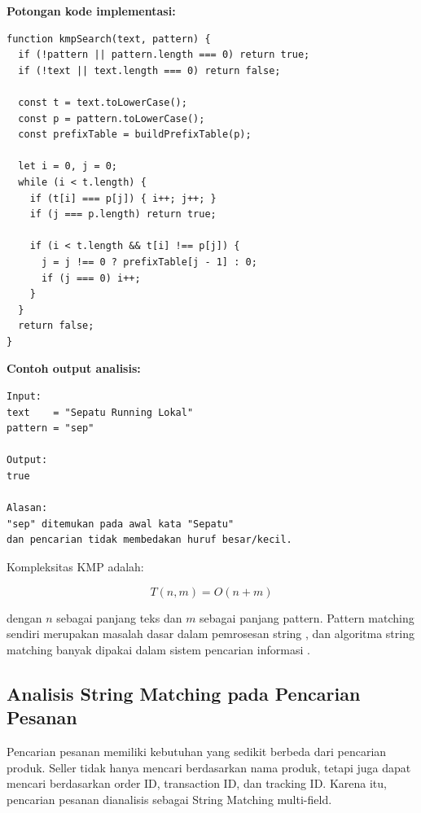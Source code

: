 \newpage
\textbf{Potongan kode implementasi:}

\begin{Verbatim}[frame=single,framesep=6pt,fontsize=\scriptsize]
function kmpSearch(text, pattern) {
  if (!pattern || pattern.length === 0) return true;
  if (!text || text.length === 0) return false;

  const t = text.toLowerCase();
  const p = pattern.toLowerCase();
  const prefixTable = buildPrefixTable(p);

  let i = 0, j = 0;
  while (i < t.length) {
    if (t[i] === p[j]) { i++; j++; }
    if (j === p.length) return true;

    if (i < t.length && t[i] !== p[j]) {
      j = j !== 0 ? prefixTable[j - 1] : 0;
      if (j === 0) i++;
    }
  }
  return false;
}
\end{Verbatim}

\textbf{Contoh output analisis:}

\begin{Verbatim}[frame=single,framesep=6pt,fontsize=\scriptsize]
Input:
text    = "Sepatu Running Lokal"
pattern = "sep"

Output:
true

Alasan:
"sep" ditemukan pada awal kata "Sepatu"
dan pencarian tidak membedakan huruf besar/kecil.
\end{Verbatim}

Kompleksitas KMP adalah:

\begin{equation}
    T(n,m) = O(n + m)
    \label{eq:kmp-complexity}
\end{equation}

dengan $n$ sebagai panjang teks dan $m$ sebagai panjang pattern. Pattern matching sendiri merupakan masalah dasar dalam pemrosesan string \parencite{Crochemore2013}, dan algoritma string matching banyak dipakai dalam sistem pencarian informasi \parencite{Al-howaide}.

\subsection{Analisis String Matching pada Pencarian Pesanan}

Pencarian pesanan memiliki kebutuhan yang sedikit berbeda dari pencarian produk. Seller tidak hanya mencari berdasarkan nama produk, tetapi juga dapat mencari berdasarkan order ID, transaction ID, dan tracking ID. Karena itu, pencarian pesanan dianalisis sebagai String Matching multi-field.

